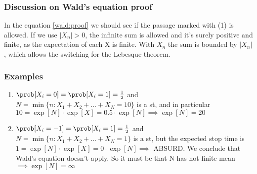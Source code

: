 \subsubsection{Discussion on Wald's equation proof}
In the equation \ref{wald:proof} we should see if the passage marked with (1) is allowed.
If we use $|X_n|>0$, the infinite sum is allowed and it's surely positive and finite, as the expectation of each X is finite.
With $X_n$ the sum is bounded by $|X_n|$, which allows the switching for the Lebesque theorem.
\subsubsection{Examples}

\begin{enumerate}
  \item $\prob[X_i=0]=\prob[X_i = 1] = \frac{1}{2}$ and $N = \min\{n : X_1 + X_2 + \dots + X_N =10\}$ is a \gls{st}, and in particular
  $10 = \exp[N] \cdot \exp[X] = 0.5 \cdot \exp[N] \implies \exp[N]=20$
  \item $\prob[X_i=-1]=\prob[X_i = 1] = \frac{1}{2}$ and $N = \min\{n : X_1 + X_2 + \dots + X_N =1\}$ is a \gls{st}, but the expected stop time
  is $1 = \exp[N] \cdot \exp[X] = 0 \cdot \exp[N] \implies $ ABSURD. We conclude that Wald's equation doesn't apply. So it must be that N has not finite mean $\implies \exp[N]=\infty$
\end{enumerate}

